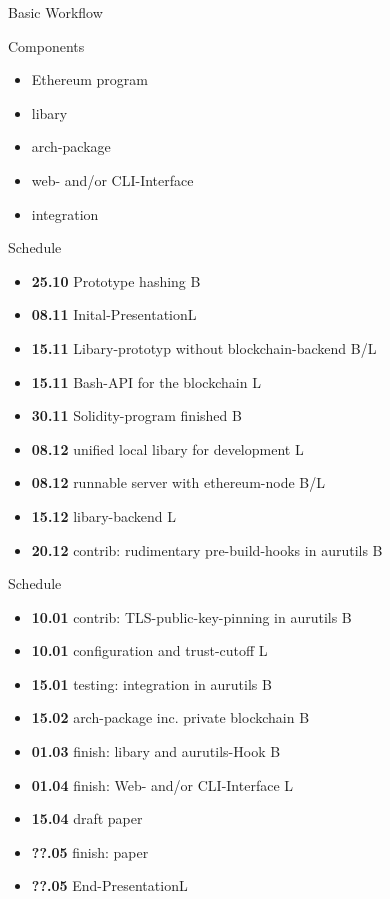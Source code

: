 \documentclass{beamer}
\begin{document}
\begin{frame}{Basic Workflow}
\end{frame}

\begin{frame}{Components}
\begin{itemize}
	\item Ethereum program
	\item libary
	\item arch-package
	\item web- and/or CLI-Interface
	\item integration
\end{itemize}
\end{frame}

\begin{frame}{Schedule}
\begin{itemize} 
	\item \textbf{25.10} Prototype hashing \hfill B
	\item \textbf{08.11} Inital-Presentation\hfill L
	\item \textbf{15.11} Libary-prototyp without blockchain-backend \hfill B/L
	\item \textbf{15.11} Bash-API for the blockchain \hfill L
	\item \textbf{30.11} Solidity-program finished \hfill B
	\item \textbf{08.12} unified local libary for development \hfill L
	\item \textbf{08.12} runnable server with ethereum-node \hfill B/L
	\item \textbf{15.12} libary-backend \hfill L
	\item \textbf{20.12} contrib: rudimentary pre-build-hooks in aurutils \hfill B
\end{itemize}
\end{frame}

\begin{frame}{Schedule}
\begin{itemize} 
	\item \textbf{10.01} contrib: TLS-public-key-pinning in aurutils \hfill B
	\item \textbf{10.01} configuration and trust-cutoff \hfill L
	\item \textbf{15.01} testing: integration in aurutils \hfill B
	\item \textbf{15.02} arch-package inc. private blockchain \hfill B
	\item \textbf{01.03} finish: libary and aurutils-Hook \hfill B
	\item \textbf{01.04} finish: Web- and/or CLI-Interface \hfill L
	\item \textbf{15.04} draft paper \hfill 
	\item \textbf{??.05} finish: paper\hfill 
	\item \textbf{??.05} End-Presentation\hfill L
\end{itemize}
\end{frame}
\end{document}
